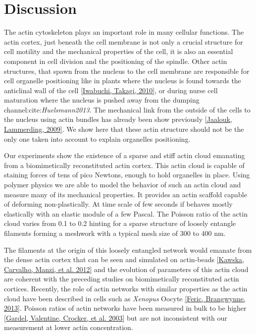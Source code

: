 \documentclass[A4paperpaper,11pt,english]{sphinxmanual}
\begin{document}
\section{Discussion}
\label{index-latex:discussion}
The actin cytoskeleton plays an important role in many cellular functions.  The
actin cortex, just beneath the cell membrane is not only a crucial structure
for cell motility and the mechanical properties of the cell, it is also an essential
component in cell division and the positioning of the spindle.
Other actin structures, that spawn from the nucleus to the cell membrane are
responsible for cell organelle positioning like in plants where the nucleus is found
towards the anticlinal wall of the cell {\hyperref[index-latex:iwabuchi2010]{{[}Iwabuchi, Takagi,  2010{]}}}, or during
nurse cell maturation where the nucleus is pushed away from the dumping channel:cite:\emph{Huelsmann2013}. The mechanical link from the
outside of the cells to the nucleus using actin bundles has already been show previously
{\hyperref[index-latex:jaalouk2009]{{[}Jaalouk, Lammerding,  2009{]}}}. We show here that these actin structure should not be the
only one taken into account to explain organelles positioning.

Our experiments show the existence of a sparse and stiff actin cloud emanating
from a biomimetically reconstituted actin cortex.  This actin cloud is capable
of staining forces of tens of pico Newtons, enough to hold organelles in place. Using polymer physics
we are able to model the behavior of such an actin cloud and
measure many of its mechanical properties. It provides an
actin scaffold capable of deforming non-plastically. At time scale of few
seconds if behaves mostly elastically with an elastic module of a few Pascal.
The Poisson ratio of the actin cloud varies from 0.1 to 0.2 hinting for a
sparse structure of loosely entangle filaments forming a meshwork with a
typical mesh size of 300 to 400 nm.

The filaments at the origin of this loosely entangled network would emanate from
the dense actin cortex that can be seen and simulated on actin-beads
{\hyperref[index-latex:kawska2012]{{[}Kawska, Carvalho, Manzi,  et al.  2012{]}}} and the evolution of parameters of this actin cloud are
coherent with the preceding studies on biomimetically reconstituted actin
cortices. Recently, the role of actin networks with similar properties as the
actin cloud have been described in cells such as \emph{Xenopus} Oocyte
{\hyperref[index-latex:feric2013]{{[}Feric, Brangwynne,  2013{]}}}. Poisson ratios of actin networks have been
measured in bulk to be higher {\hyperref[index-latex:gardel2003]{{[}Gardel, Valentine, Crocker,  et al.  2003{]}}} but are not inconsistent with our measurement at lower actin concentration.
\end{document}
